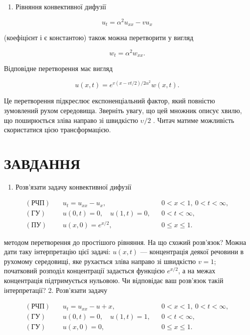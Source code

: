 \begin{enumerate}
\def\labelenumi{\arabic{enumi}.}
\setcounter{enumi}{1}
\tightlist
\item
  Рівняння конвективної дифузії
\end{enumerate}

\[
u_t = \alpha^2 u_{xx} - v u_x
\]

(коефіцієнт і є константою) також можна перетворити у вигляд

\[
w_t = \alpha^2 w_{xx}.
\]

Відповідне перетворення має вигляд

\[
u(x, t) = e^{v(x-vt/2)/2\alpha^2}w(x, t).
\]

Це перетворення підкреслює експоненціальний фактор, який повністю зумовлений рухом середовища. Зверніть увагу, що цей множник описує хвилю, що поширюється зліва направо зі швидкістю \(\upsilon/2\) . Читач матиме можливість скористатися цією трансформацією.

\section{ЗАВДАННЯ}\label{ux437ux430ux432ux434ux430ux43dux43dux44f-7}

\begin{enumerate}
\def\labelenumi{\arabic{enumi}.}
\tightlist
\item
  Розв'язати задачу конвективної дифузії
\end{enumerate}

\[
\begin{aligned}
(\text{РЧП})\quad & u_t = u_{xx} - u_x, && 0 < x < 1,\ 0 < t < \infty, \\
(\text{ГУ})\quad & u(0,t) = 0,\quad u(1,t) = 0, && 0 < t < \infty, \\
(\text{ПУ})\quad & u(x,0) = e^{x/2}, && 0 \leqslant x \leqslant 1.
\end{aligned}
\]

методом перетворення до простішого рівняння. На що схожий розв'язок? Можна дати таку інтерпретацію цієї задачі: \(u(x,t)\) --- концентрація деякої речовини в рухомому середовищі, яке рухається зліва направо зі швидкістю \(v = 1\); початковий розподіл концентрації задається функцією \(e^{x/2}\), а на межах концентрація підтримується нульовою. Чи відповідає ваш розв'язок такій інтерпретації? 2. Розв'язати задачу

\[
\begin{aligned}
(\text{РЧП})\quad & u_t = u_{xx} - u + x, && 0 < x < 1,\ 0 < t < \infty, \\
(\text{ГУ})\quad & u(0,t) = 0,\quad u(1,t) = 1, && 0 < t < \infty, \\
(\text{ГУ})\quad & u(x,0) = 0, && 0 \leqslant x \leqslant 1.
\end{aligned}
\]

